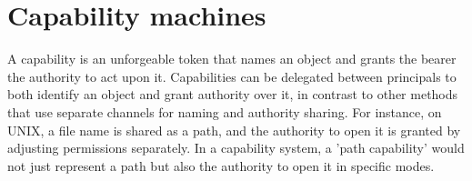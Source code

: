 \section{Capability machines}
A capability is an unforgeable token that names an object and grants the bearer the authority to act upon it. Capabilities can be delegated between 
principals to both identify an object and grant authority over it, in contrast to other methods that use separate channels for 
naming and authority sharing. For instance, on UNIX, a file name is shared as a path, and the authority to open it is 
granted by adjusting permissions separately. In a capability system, a 'path capability' would not just represent a 
path but also the authority to open it in specific modes.
\newline

